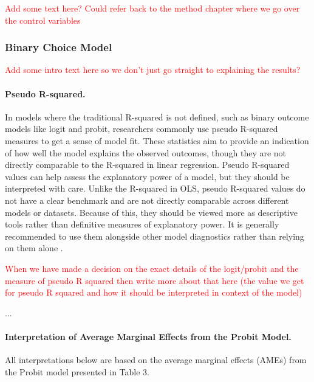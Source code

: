 \textcolor{red}{Add some text here? Could refer back to the method chapter where we go over the control variables}

\subsubsection{Binary Choice Model}

\textcolor{red}{Add some intro text here so we don't just go straight to explaining the results?}

\paragraph{Pseudo R-squared.} In models where the traditional R-squared is not defined, such as binary outcome models like logit and probit, researchers commonly use pseudo R-squared measures to get a sense of model fit. These statistics aim to provide an indication of how well the model explains the observed outcomes, though they are not directly comparable to the R-squared in linear regression. Pseudo R-squared values can help assess the explanatory power of a model, but they should be interpreted with care. Unlike the R-squared in OLS, pseudo R-squared values do not have a clear benchmark and are not directly comparable across different models or datasets. Because of this, they should be viewed more as descriptive tools rather than definitive measures of explanatory power. It is generally recommended to use them alongside other model diagnostics rather than relying on them alone \citep{ozili_acceptable_2023}.

\textcolor{red}{When we have made a decision on the exact details of the logit/probit and the measure of pseudo R squared then write more about that here (the value we get for pseudo R squared and how it should be interpreted in context of the model)}




% 


...

\paragraph{Interpretation of Average Marginal Effects from the Probit Model.} All interpretations below are based on the average marginal effects (AMEs) from the Probit model presented in Table 3.

